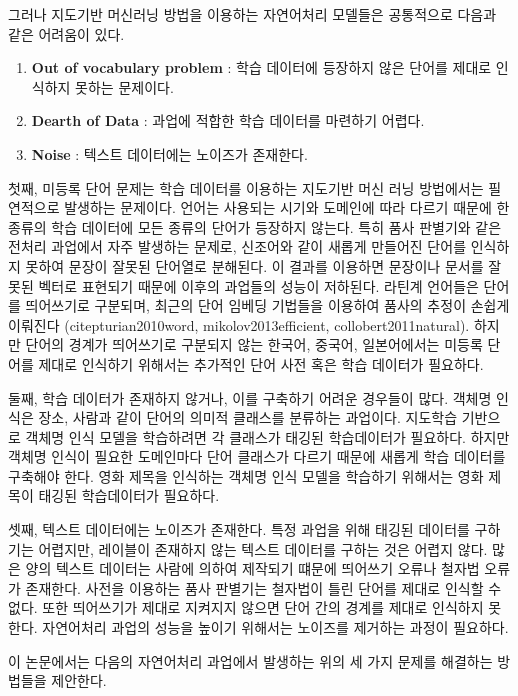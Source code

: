 \documentclass[11pt]{article}
\begin{document}
그러나 지도기반 머신러닝 방법을 이용하는 자연어처리 모델들은 공통적으로 다음과 같은 어려움이 있다.

\begin{enumerate}
    \item \textbf{Out of vocabulary problem} : 학습 데이터에 등장하지 않은 단어를 제대로 인식하지 못하는 문제이다.
    \item \textbf{Dearth of Data} : 과업에 적합한 학습 데이터를 마련하기 어렵다.
    \item \textbf{Noise} : 텍스트 데이터에는 노이즈가 존재한다.
\end{enumerate}

첫째, 미등록 단어 문제는 학습 데이터를 이용하는 지도기반 머신 러닝 방법에서는 필연적으로 발생하는 문제이다.
언어는 사용되는 시기와 도메인에 따라 다르기 때문에 한 종류의 학습 데이터에 모든 종류의 단어가 등장하지 않는다.
특히 품사 판별기와 같은 전처리 과업에서 자주 발생하는 문제로, 신조어와 같이 새롭게 만들어진 단어를 인식하지 못하여 문장이 잘못된 단어열로 분해된다.
이 결과를 이용하면 문장이나 문서를 잘못된 벡터로 표현되기 때문에 이후의 과업들의 성능이 저하된다.
라틴계 언어들은 단어를 띄어쓰기로 구분되며, 최근의 단어 임베딩 기법들을 이용하여 품사의 추정이 손쉽게 이뤄진다 (citep{turian2010word, mikolov2013efficient, collobert2011natural}).
하지만 단어의 경계가 띄어쓰기로 구분되지 않는 한국어, 중국어, 일본어에서는 미등록 단어를 제대로 인식하기 위해서는 추가적인 단어 사전 혹은 학습 데이터가 필요하다.

둘째, 학습 데이터가 존재하지 않거나, 이를 구축하기 어려운 경우들이 많다.
객체명 인식은 장소, 사람과 같이 단어의 의미적 클래스를 분류하는 과업이다.
지도학습 기반으로 객체명 인식 모델을 학습하려면 각 클래스가 태깅된 학습데이터가 필요하다.
하지만 객체명 인식이 필요한 도메인마다 단어 클래스가 다르기 때문에 새롭게 학습 데이터를 구축해야 한다.
영화 제목을 인식하는 객체명 인식 모델을 학습하기 위해서는 영화 제목이 태깅된 학습데이터가 필요하다.

셋째, 텍스트 데이터에는 노이즈가 존재한다.
특정 과업을 위해 태깅된 데이터를 구하기는 어렵지만, 레이블이 존재하지 않는 텍스트 데이터를 구하는 것은 어렵지 않다.
많은 양의 텍스트 데이터는 사람에 의하여 제작되기 떄문에 띄어쓰기 오류나 철자법 오류가 존재한다.
사전을 이용하는 품사 판별기는 철자법이 틀린 단어를 제대로 인식할 수 없다.
또한 띄어쓰기가 제대로 지켜지지 않으면 단어 간의 경계를 제대로 인식하지 못한다.
자연어처리 과업의 성능을 높이기 위해서는 노이즈를 제거하는 과정이 필요하다.

이 논문에서는 다음의 자연어처리 과업에서 발생하는 위의 세 가지 문제를 해결하는 방법들을 제안한다.
\end{document}
